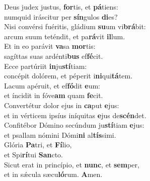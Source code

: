 \evenverse Deus judex justus, \textbf{for}tis, et \textbf{pá}tiens:~\*\\
\evenverse numquid iráscitur per \textbf{sín}gulos \textbf{di}es?\\
\oddverse Nisi convérsi fuéritis, gládium \textbf{su}um vi\textbf{brá}bit:~\*\\
\oddverse arcum suum teténdit, et pa\textbf{rá}vit \textbf{il}lum.\\
\evenverse Et in eo parávit \textbf{va}sa \textbf{mor}tis:~\*\\
\evenverse sagíttas suas ardénti\textbf{bus} ef\textbf{fé}cit.\\
\oddverse Ecce partúriit \textbf{in}ju\textbf{stí}tiam:~\*\\
\oddverse concépit dolórem, et péperit i\textbf{ni}qui\textbf{tá}tem.\\
\evenverse Lacum apéruit, et ef\textbf{fó}dit \textbf{e}um:~\*\\
\evenverse et íncidit in fóve\textbf{am} quam \textbf{fe}cit.\\
\oddverse Convertétur dolor ejus in \textbf{ca}put \textbf{e}jus:~\*\\
\oddverse et in vérticem ipsíus iníquitas \textbf{e}jus de\textbf{scén}det.\\
\evenverse Confitébor Dómino secúndum ju\textbf{stí}tiam \textbf{e}jus:~\*\\
\evenverse et psallam nómini Dómi\textbf{ni} al\textbf{tís}simi.\\
\oddverse Glória \textbf{Pa}tri, et \textbf{Fí}lio,~\*\\
\oddverse et Spi\textbf{rí}tui \textbf{San}cto.\\
\evenverse Sicut erat in princípio, et \textbf{nunc}, et \textbf{sem}per,~\*\\
\evenverse et in sǽcula sæcu\textbf{ló}rum. \textbf{A}men.\\

